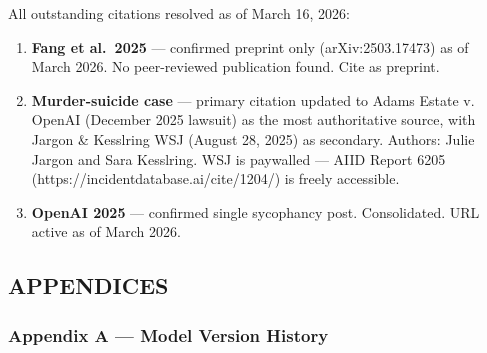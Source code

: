 All outstanding citations resolved as of March 16, 2026:

\begin{enumerate}
\def\labelenumi{\arabic{enumi}.}
\item
  \textbf{Fang et al.~2025} --- confirmed preprint only
  (arXiv:2503.17473) as of March 2026. No peer-reviewed publication
  found. Cite as preprint.
\item
  \textbf{Murder-suicide case} --- primary citation updated to Adams
  Estate v. OpenAI (December 2025 lawsuit) as the most authoritative
  source, with Jargon \& Kesslring WSJ (August 28, 2025) as secondary.
  Authors: Julie Jargon and Sara Kesslring. WSJ is paywalled --- AIID
  Report 6205 (https://incidentdatabase.ai/cite/1204/) is freely
  accessible.
\item
  \textbf{OpenAI 2025} --- confirmed single sycophancy post.
  Consolidated. URL active as of March 2026.
\end{enumerate}

\subsection{APPENDICES}\label{appendices}

\subsubsection{Appendix A --- Model Version
History}\label{appendix-a-model-version-history}

